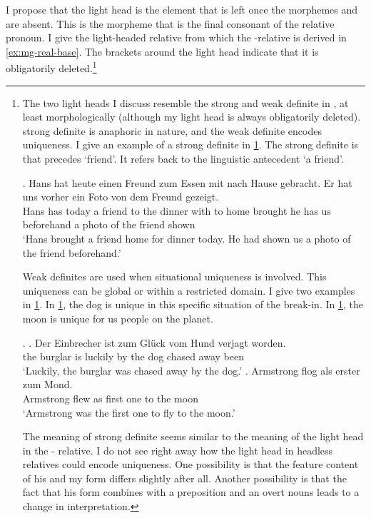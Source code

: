 I propose that the light head is the element that is left once the morphemes  and  are absent. This is the morpheme that is the final consonant of the relative pronoun. I give the light-headed relative from which the -relative is derived in \ref{ex:mg-real-base}. The brackets around the light head indicate that it is obligatorily deleted.\footnote{
The two light heads I discuss resemble the strong and weak definite in \citet{schwarz2009}, at least morphologically (although my light head is always obligatorily deleted).  strong definite is anaphoric in nature, and the weak definite encodes uniqueness. I give an example of a strong definite in \ref{ex:mg-florian-strong}. The strong definite is  that precedes  `friend'. It refers back to the linguistic antecedent  `a friend'.

\exg. Hans hat heute einen Freund zum Essen mit nach Hause gebracht. Er hat uns vorher ein Foto von dem Freund gezeigt.\\
Hans has today a friend {to the} dinner with to home brought he has us beforehand a photo of the friend shown\\
`Hans brought a friend home for dinner today. He had shown us a photo of the friend beforehand.'\label{ex:mg-florian-strong}

Weak definites are used when situational uniqueness is involved. This uniqueness can be global or within a restricted domain. I give two examples in \ref{ex:mg-florian-weak}. In \ref{ex:mg-florian-weak-hund}, the dog is unique in this specific situation of the break-in. In \ref{ex:mg-florian-weak-mond}, the moon is unique for us people on the planet.

\ex.\label{ex:mg-florian-weak}
\ag. Der Einbrecher ist {zum Glück} vom Hund verjagt worden.\\
the burglar is luckily {by the} dog {chased away} been\\
`Luckily, the burglar was chased away by the dog.'\label{ex:mg-florian-weak-hund}
\bg. Armstrong flog als erster zum Mond.\\
Armstrong flew as {first one} {to the} moon\\
`Armstrong was the first one to fly to the moon.' \label{ex:mg-florian-weak-mond}

The meaning of  strong definite seems similar to the meaning of the light head in the - relative.
I do not see right away how the light head in headless relatives could encode uniqueness. One possibility is that the feature content of his and my form differs slightly after all. Another possibility is that the fact that his form combines with a preposition and an overt nouns leads to a change in interpretation.
}

